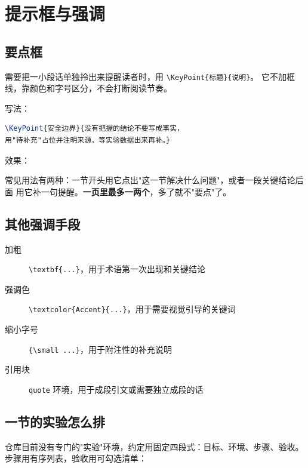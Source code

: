 \section{提示框与强调}
\label{sec:00-boxes}

\subsection{要点框}

需要把一小段话单独拎出来提醒读者时，用 \verb|\KeyPoint{标题}{说明}|。
它不加框线，靠颜色和字号区分，不会打断阅读节奏。

写法：

\begin{lstlisting}[language=TeX]
\KeyPoint{安全边界}{没有把握的结论不要写成事实，
用"待补充"占位并注明来源，等实验数据出来再补。}
\end{lstlisting}

效果：


常见用法有两种：一节开头用它点出"这一节解决什么问题"，或者一段关键结论后面
用它补一句提醒。\textbf{一页里最多一两个}，多了就不"要点"了。

\subsection{其他强调手段}

\begin{description}
  \item[加粗] \verb|\textbf{...}|，用于术语第一次出现和关键结论
  \item[强调色] \verb|\textcolor{Accent}{...}|，用于需要视觉引导的关键词
  \item[缩小字号] \verb|{\small ...}|，用于附注性的补充说明
  \item[引用块] \texttt{quote} 环境，用于成段引文或需要独立成段的话
\end{description}

\subsection{一节的实验怎么排}

仓库目前没有专门的"实验"环境，约定用固定四段式：目标、环境、步骤、验收。
步骤用有序列表，验收用可勾选清单：


